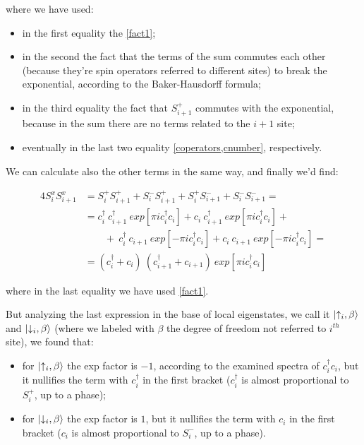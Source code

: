 \noindent where we have used:
\begin{itemize}
	\item in the first equality the \cref{fact1};
	\item in the second the fact that the terms of the sum commutes each other (because they're spin operators referred to different sites) to break the exponential, according to the Baker-Hausdorff formula;
	\item in the third equality the fact that $S_{i+1}^+$ commutes with the exponential, because in the sum there are no terms related to the $i+1$ site;
	\item eventually in the last two equality \cref{coperators,cnumber}, respectively.
\end{itemize}

We can calculate also the other terms in the same way, and finally we'd find:

\begin{align*}
4 S_i^x S_{i+1}^x &= S_i^+ S_{i+1}^+ + S_i^- S_{i+1}^+ + S_i^+ S_{i+1}^- + S_i^- S_{i+1}^- = \\
&= c_i^\dagger~c_{i+1}^\dagger~exp[\pi i c_i^\dagger c_i] + c_i~c_{i+1}^\dagger~exp[\pi i c_i^\dagger c_i] +\\
&\qquad +~c_i^\dagger~c_{i+1}~exp[-\pi i c_i^\dagger c_i] + c_i~c_{i+1}~exp[-\pi i c_i^\dagger c_i] =\\
&= (c_i^\dagger + c_i)~(c_{i+1}^\dagger + c_{i+1})~exp[\pi i c_i^\dagger c_i]
\end{align*}

\noindent where in the last equality we have used \cref{fact1}.

But analyzing the last expression in the base of local eigenstates, we call it $\ket{\uparrow_i, \beta}$ and $\ket{\downarrow_i, \beta}$ (where we labeled with $\beta$ the degree of freedom not referred to $i^{th}$ site), we found that:
\begin{itemize}
	\item for $\ket{\uparrow_i, \beta}$ the exp factor is $-1$, according to the examined spectra of $c_i^\dagger c_i$, but it nullifies the term with $c_i^\dagger$ in the first bracket ($c_i^\dagger$ is almost proportional to $S_i^+$, up to a phase);
	\item for $\ket{\downarrow_i, \beta}$ the exp factor is $1$, but it nullifies the term with $c_i$ in the first bracket ($c_i$ is almost proportional to $S_i^-$, up to a phase).
\end{itemize}

